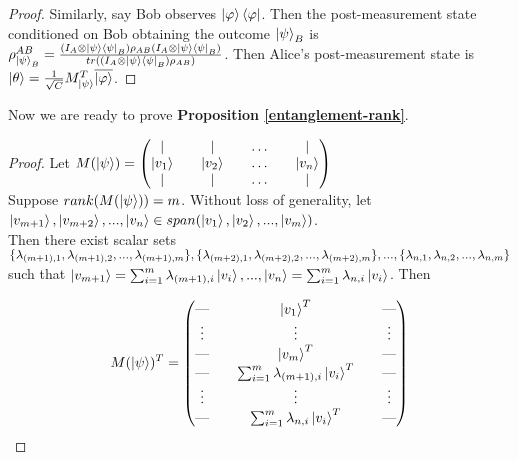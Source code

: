 \begin{proof}
Similarly, say Bob observes $\ket{\varphi}\bra{\varphi}$. Then the post-measurement state conditioned on Bob obtaining the outcome $\ket{\psi}_B$ is $\rho_{\ket{\psi}_B}^{AB}=\frac{(I_A \otimes \ket{\psi}\bra{\psi}_B  )\rho_{AB}(I_A \otimes \ket{\psi}\bra{\psi}_B)}{tr((I_A \otimes \ket{\psi}\bra{\psi}_B)\rho_{AB})}$.
Then Alice's post-measurement state is $\ket{\theta}=\frac{1}{\sqrt{C}} M_{\ket{\psi}}^T \overline{\ket{\varphi}}$.
\end{proof}

\bigskip
Now we are ready to prove \textbf{Proposition \ref{entanglement-rank}}.
\begin{proof}
Let $M(\ket{\psi})=
\begin{pmatrix}
\vert && \vert && \hdots && \vert\\
\ket{v_1} && \ket{v_2} && \hdots && \ket{v_n}\\
\vert && \vert && \hdots && \vert\\
\end{pmatrix}$\\
Suppose $rank(M(\ket{\psi}))=m$. Without loss of generality, let $\ket{v_{m+1}}, \ket{v_{m+2}},...,\ket{v_n} \in span(\ket{v_1},\ket{v_2},...,\ket{v_m})$.\\
Then there exist scalar sets $\{\lambda_{(m+1),1}, \lambda_{(m+1),2},..., \lambda_{(m+1),m}\}, \{\lambda_{(m+2),1}, \lambda_{(m+2),2},..., \lambda_{(m+2),m}\},...,\\
\{\lambda_{n,1}, \lambda_{n,2},..., \lambda_{n,m}\}$ such that $\ket{v_{m+1}}=\sum_{i=1}^m \lambda_{(m+1), i}\ket{v_i},...,\ket{v_n}=\sum_{i=1}^m \lambda_{n, i}\ket{v_i}$. Then

\begin{equation}
M(\ket{\psi})^T=\begin{pmatrix}
\text{---} && \ket{v_1}^T &&\text{---} \\
\vdots && \vdots && \vdots\\
\text{---} && \ket{v_m}^T && \text{---} \\
\text{---} && \sum_{i=1}^m \lambda_{(m+1), i}\ket{v_i}^T  &&\text{---} \\
\vdots && \vdots && \vdots \\
\text{---} && \sum_{i=1}^m \lambda_{n, i}\ket{v_i}^T &&\text{---} \\
\end{pmatrix}    
\end{equation}


\end{proof}
